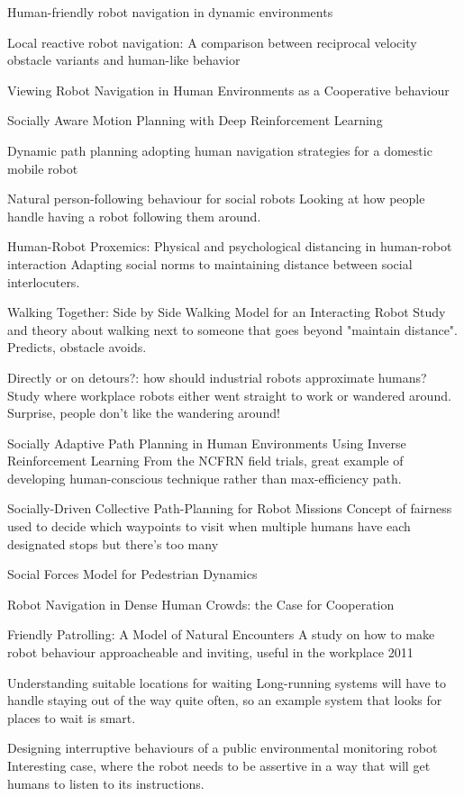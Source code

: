 \documentclass{sfuthesis}
\begin{document}
 Human-friendly robot navigation in dynamic environments 

Local reactive robot navigation: A comparison between reciprocal velocity obstacle variants and human-like behavior 

Viewing Robot Navigation in Human Environments as a Cooperative behaviour

Socially Aware Motion Planning with Deep Reinforcement Learning

Dynamic path planning adopting human navigation strategies for a domestic mobile robot

Natural person-following behaviour for social robots	Looking at how people handle having a robot following them around.	

Human-Robot Proxemics: Physical and psychological distancing in human-robot interaction	Adapting social norms to maintaining distance between social interlocuters.

Walking Together: Side by Side Walking Model for an Interacting Robot	Study and theory about walking next to someone that goes beyond "maintain distance". Predicts, obstacle avoids.

Directly or on detours?: how should industrial robots approximate humans?	Study where workplace robots either went straight to work or wandered around. Surprise, people don't like the wandering around!	

Socially Adaptive Path Planning in Human Environments Using Inverse Reinforcement Learning	From the NCFRN field trials, great example of developing human-conscious technique rather than max-efficiency path.	

Socially-Driven Collective Path-Planning for Robot Missions	Concept of fairness used to decide which waypoints to visit when multiple humans have each designated stops but there's too many

Social Forces Model for Pedestrian Dynamics

Robot Navigation in Dense Human Crowds: the Case for Cooperation

Friendly Patrolling: A Model of Natural Encounters	A study on how to make robot behaviour approacheable and inviting, useful in the workplace	2011

Understanding suitable locations for waiting	Long-running systems will have to handle staying out of the way quite often, so an example system that looks for places to wait is smart.	

Designing interruptive behaviours of a public environmental monitoring robot	Interesting
 case, where the robot needs to be assertive in a way that will get humans to listen to its instructions.	
\end{document}
